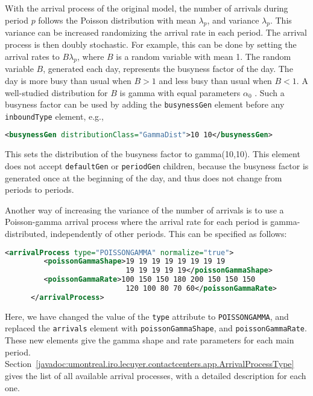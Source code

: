 With the arrival process of the original model, the number of arrivals
during period $p$ follows the Poisson distribution with mean
$\lambda_p$, and variance $\lambda_p$.
This variance can be increased randomizing the arrival rate in each
period.
The arrival process is then doubly stochastic.
For example, this can be done
by setting the arrival rates to
$B\lambda_p$, where $B$ is a random variable with mean 1.
The random variable $B$, generated each day,
represents the busyness factor of the day.
The day is more busy than usual when $B>1$ and less busy than usual
when $B<1$.
A well-studied distribution for $B$ is gamma with equal parameters
$\alpha_0$ \cite{ccAVR04a}.
Such a busyness factor can be used by adding the
\texttt{busyness\-Gen} element before any \texttt{inbound\-Type}
element, e.g.,
\begin{lstlisting}[language=XML]
   <busynessGen distributionClass="GammaDist">10 10</busynessGen>
\end{lstlisting}
This sets the distribution of the busyness factor to gamma(10,10).
This element does not accept \texttt{default\-Gen} or
\texttt{period\-Gen} children, because the busyness factor is
generated once at the beginning of the day, and thus does not change
from periods to periods.

Another way of increasing the variance of the number of arrivals is to
use a Poisson-gamma arrival process where the arrival rate for each
period is gamma-distributed, independently of other periods.
This can be specified as follows:
\begin{lstlisting}[language=XML]
      <arrivalProcess type="POISSONGAMMA" normalize="true">
         <poissonGammaShape>19 19 19 19 19 19 19 19
                            19 19 19 19 19</poissonGammaShape>
         <poissonGammaRate>100 150 150 180 200 150 150 150
                            120 100 80 70 60</poissonGammaRate>
      </arrivalProcess>
\end{lstlisting}
Here, we have changed the value of the \texttt{type} attribute to
\texttt{POISSONGAMMA}, and replaced the \texttt{arrivals} element
with \texttt{poisson\-Gamma\-Shape}, and
\texttt{poisson\-Gamma\-Rate}.
These new elements give the
gamma shape and rate parameters for each main
period.
Section~\ref{javadoc:umontreal.iro.lecuyer.contactcenters.app.ArrivalProcessType}
gives the list of all available arrival processes, with a detailed
description for each one.


